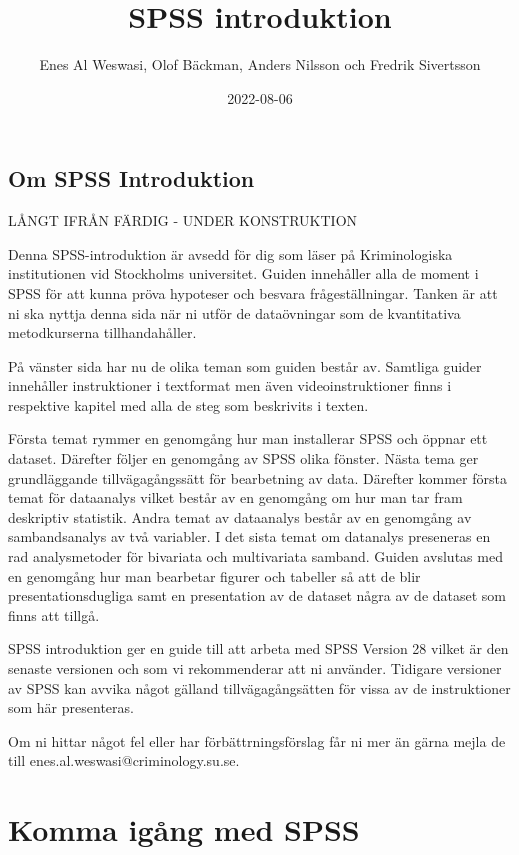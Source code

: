 \documentclass[
]{book}
\title{SPSS introduktion}
\author{Enes Al Weswasi, Olof Bäckman, Anders Nilsson och Fredrik Sivertsson}
\date{2022-08-06}
\begin{document}
\maketitle

{
\hypersetup{linkcolor=}
\setcounter{tocdepth}{1}
\tableofcontents
}
\hypertarget{om-spss-introduktion}{%
\chapter*{Om SPSS Introduktion}\label{om-spss-introduktion}}

LÅNGT IFRÅN FÄRDIG - UNDER KONSTRUKTION

Denna SPSS-introduktion är avsedd för dig som läser på Kriminologiska institutionen vid Stockholms universitet. Guiden innehåller alla de moment i SPSS för att kunna pröva hypoteser och besvara frågeställningar. Tanken är att ni ska nyttja denna sida när ni utför de dataövningar som de kvantitativa metodkurserna tillhandahåller.

På vänster sida har nu de olika teman som guiden består av. Samtliga guider innehåller instruktioner i textformat men även videoinstruktioner finns i respektive kapitel med alla de steg som beskrivits i texten.

Första temat rymmer en genomgång hur man installerar SPSS och öppnar ett dataset. Därefter följer en genomgång av SPSS olika fönster. Nästa tema ger grundläggande tillvägagångssätt för bearbetning av data. Därefter kommer första temat för dataanalys vilket består av en genomgång om hur man tar fram deskriptiv statistik. Andra temat av dataanalys består av en genomgång av sambandsanalys av två variabler. I det sista temat om datanalys preseneras en rad analysmetoder för bivariata och multivariata samband. Guiden avslutas med en genomgång hur man bearbetar figurer och tabeller så att de blir presentationsdugliga samt en presentation av de dataset några av de dataset som finns att tillgå.

SPSS introduktion ger en guide till att arbeta med SPSS Version 28 vilket är den senaste versionen och som vi rekommenderar att ni använder. Tidigare versioner av SPSS kan avvika något gälland tillvägagångsätten för vissa av de instruktioner som här presenteras.

Om ni hittar något fel eller har förbättrningsförslag får ni mer än gärna mejla de till enes.al.weswasi@criminology.su.se.

\hypertarget{part-komma-iguxe5ng-med-spss}{%
\part*{Komma igång med SPSS}\label{part-komma-iguxe5ng-med-spss}}
\end{document}
